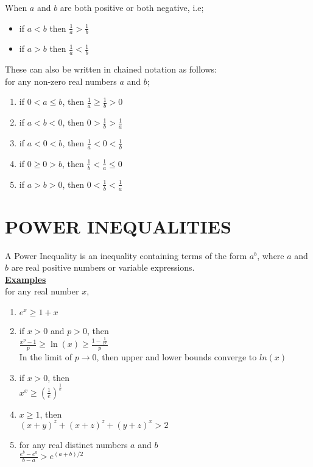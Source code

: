 \documentclass[12pt]{report}
\newcommand{\ubt}[1]{\textbf{\underline{#1}}}
\newcommand{\spn}[1]{\\[#1cm]}
\newcommand{\NI}{\noindent}
\newcommand{\dsp}{\displaystyle}
\begin{document}
	\NI When $a$ and $b$ are both positive or both negative, i.e;
	\begin{itemize}
		\item if $a<b$ then $\frac{1}{a} > \frac{1}{b}$
		\item if $a>b$ then $\frac{1}{a} < \frac{1}{b}$
	\end{itemize}
	
	\NI These can also be written in chained notation as follows:\\
	for any non-zero real numbers $a$ and $b$;
	\begin{enumerate}
		\item if $0<a \leq b$, then $\frac{1}{a} \geq \frac{1}{b} > 0$
		\item if $a<b<0$, then $0 > \frac{1}{b} > \frac{1}{a}$
		\item if $a<0<b$, then $\frac{1}{a}<0<\frac{1}{b}$
		\item if $0\geq0>b$, then $\frac{1}{b} < \frac{1}{a} \leq 0$
		\item if $a>b>0$, then $0 < \frac{1}{b} < \frac{1}{a}$
	\end{enumerate}	
	
	\section{POWER INEQUALITIES}
	A Power Inequality is an inequality containing terms of the form $a^b$, where $a$ and $b$ are real positive numbers or variable expressions.\spn{0.4}
	\ubt{Examples}\\
	for any real number $x$,
	\begin{enumerate}
		\item $e^x \geq 1 + x$
		\item if $\displaystyle x>0$ and $p>0$, then \\ $\frac{x^p-1}{p} \geq \ln(x) \geq \frac{1-\frac{1}{x^p}}{p}$ \\
		
		\NI In the limit of $p\rightarrow 0$, then upper and lower bounds converge to $ln(x)$
		
		\item if $x>0$, then \\
		     $\displaystyle x^x \geq (\frac{1}{e})^{\frac{1}{e}}$
		
		\item $x \geq 1$, then\\
			$\dsp (x+y)^z + (x+z)^z + (y+z)^x > 2$
			
		\item for any real distinct numbers $a$ and $b$\\
			$\dsp \frac{e^b - e^a}{b-a} > e^{(a+b)/2}$
	\end{enumerate}
	
\end{document}
